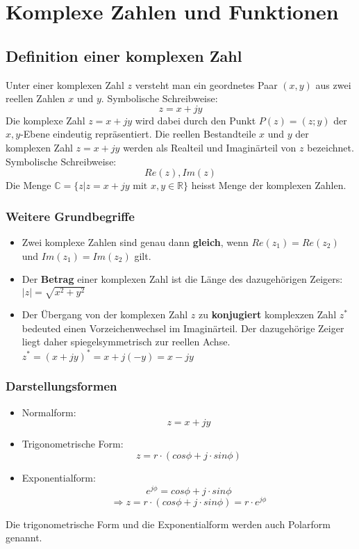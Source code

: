 \chapter{Komplexe Zahlen und Funktionen}
\section{Definition einer komplexen Zahl}
Unter einer komplexen Zahl $z$ versteht man ein geordnetes Paar $(x, y)$ aus zwei reellen Zahlen $x$ und $y$. Symbolische Schreibweise:
$$z=x + jy$$
Die komplexe Zahl $z = x + jy$ wird dabei durch den Punkt $P(z) = (z; y)$ der $x, y$-Ebene eindeutig repräsentiert. Die reellen Bestandteile $x$ und $y$ der komplexen Zahl $z = x+ jy$ werden als Realteil und Imaginärteil von $z$ bezeichnet. Symbolische Schreibweise:
$$Re(z), Im(z)$$
Die Menge $\mathbb{C}=\{z|z=x+jy \text{ mit } x, y \in \mathbb{R}\}$ heisst Menge der komplexen Zahlen.
\subsection{Weitere Grundbegriffe}
\begin{itemize}
	\item Zwei komplexe Zahlen sind genau dann \textbf{gleich}, wenn $Re(z_1) = Re(z_2)$ und $Im(z_1) = Im(z_2)$ gilt.
	\item Der \textbf{Betrag} einer komplexen Zahl ist die Länge des dazugehörigen Zeigers: $|z| = \sqrt{x^2+y^2}$
	\item Der Übergang von der komplexen Zahl $z$ zu \textbf{konjugiert} komplexzen Zahl $z^*$ bedeuted einen Vorzeichenwechsel im Imaginärteil. Der dazugehörige Zeiger liegt daher spiegelsymmetrisch zur reellen Achse. $z^* = (x + jy)^* = x + j(-y) = x - jy$
\end{itemize}

\subsection{Darstellungsformen}
\begin{itemize}
	\item Normalform: $$z=x + jy$$
	\item Trigonometrische Form: $$z= r \cdot (cos\phi + j \cdot sin\phi)$$ 
	\item Exponentialform: $$e^{j\phi} =  cos\phi + j \cdot sin\phi$$ $$ \Rightarrow z = r \cdot (cos\phi + j \cdot sin\phi) = r \cdot e^{j\phi}$$
\end{itemize}
Die trigonometrische Form und die Exponentialform werden auch Polarform genannt.

